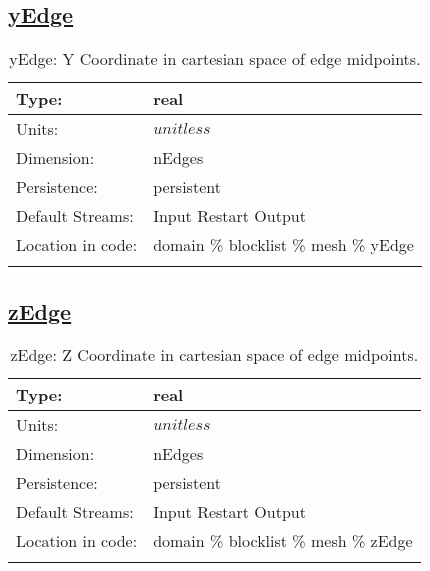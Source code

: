 \subsection[yEdge]{\hyperref[sec:var_tab_mesh]{yEdge}}
\label{subsec:var_sec_mesh_yEdge}
\begin{center}
\begin{longtable}{| p{2.0in} | p{4.0in} |}
        \hline 
        Type: & real \\
        \hline 
        Units: & $unitless$ \\
        \hline 
        Dimension: & nEdges \\
        \hline 
        Persistence: & persistent \\
        \hline 
		 Default Streams: & Input Restart Output  \\
        \hline 
		 Location in code: & domain \% blocklist \% mesh \% yEdge \\
		 \hline 
    \caption{yEdge: Y Coordinate in cartesian space of edge midpoints.}
\end{longtable}
\end{center}
\subsection[zEdge]{\hyperref[sec:var_tab_mesh]{zEdge}}
\label{subsec:var_sec_mesh_zEdge}
\begin{center}
\begin{longtable}{| p{2.0in} | p{4.0in} |}
        \hline 
        Type: & real \\
        \hline 
        Units: & $unitless$ \\
        \hline 
        Dimension: & nEdges \\
        \hline 
        Persistence: & persistent \\
        \hline 
		 Default Streams: & Input Restart Output  \\
        \hline 
		 Location in code: & domain \% blocklist \% mesh \% zEdge \\
		 \hline 
    \caption{zEdge: Z Coordinate in cartesian space of edge midpoints.}
\end{longtable}
\end{center}
